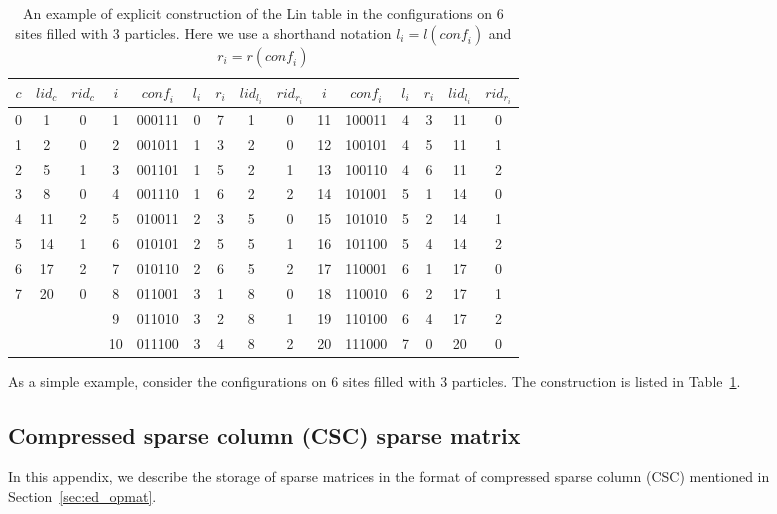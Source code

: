 \documentclass{timesjhep}
\begin{document}
\begin{table}[hbtp]
    \centering
    \begin{tabular}{ccc|cccccc|cccccc}
        \hline\hline
        $c$&$\mathit{lid}_c$&$\mathit{rid}_c$&$i$&$\mathit{conf}_i$&$l_i$&$r_i$&$\mathit{lid}_{l_i}$&$\mathit{rid}_{r_i}$&$i$&$\mathit{conf}_i$&$l_i$&$r_i$&$\mathit{lid}_{l_i}$&$\mathit{rid}_{r_i}$\\
        \hline
        0& 1&0& 1&000111&0&7&1&0&11&100011&4&3&11&0\\
        1& 2&0& 2&001011&1&3&2&0&12&100101&4&5&11&1\\
        2& 5&1& 3&001101&1&5&2&1&13&100110&4&6&11&2\\
        3& 8&0& 4&001110&1&6&2&2&14&101001&5&1&14&0\\
        4&11&2& 5&010011&2&3&5&0&15&101010&5&2&14&1\\
        5&14&1& 6&010101&2&5&5&1&16&101100&5&4&14&2\\
        6&17&2& 7&010110&2&6&5&2&17&110001&6&1&17&0\\
        7&20&0& 8&011001&3&1&8&0&18&110010&6&2&17&1\\
         &  & & 9&011010&3&2&8&1&19&110100&6&4&17&2\\
         &  & &10&011100&3&4&8&2&20&111000&7&0&20&0\\
        \hline\hline
    \end{tabular}
    \caption{An example of explicit construction of the Lin table in the configurations on 6 sites filled with 3 particles. Here we use a shorthand notation $l_i=l(\mathit{conf}_i)$ and $r_i=r(\mathit{conf}_i)$}
    \label{tbl:lin_eg}
\end{table}

As a simple example, consider the configurations on 6 sites filled with 3 particles. The construction is listed in Table~\ref{tbl:lin_eg}.

\FloatBarrier

\subsection{Compressed sparse column (CSC) sparse matrix}
\label{app:data_csc}

In this appendix, we describe the storage of sparse matrices in the format of compressed sparse column (CSC) mentioned in Section~\ref{sec:ed_opmat}.
\end{document}
